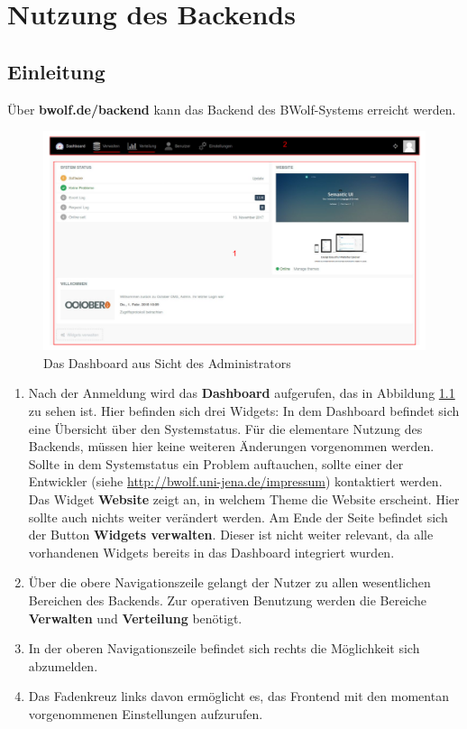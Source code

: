 \chapter{Nutzung des Backends}
\label{chapter:use}
  
  \section{Einleitung}
  \label{section:backend_introduction}
  
  Über \textbf{bwolf.de/backend} kann das Backend des BWolf-Systems erreicht werden.
  
  \begin{figure}
  	\centering
  	\includegraphics[scale=0.5]{backend/img/dashboard.pdf}
  	\caption{Das Dashboard aus Sicht des Administrators}
  	\label{fig:dashboard}
  \end{figure}
  \begin{enumerate}
   \item Nach der Anmeldung wird das \textbf{Dashboard} aufgerufen, das in Abbildung \ref{fig:dashboard} zu sehen ist. 
	  Hier befinden sich drei Widgets:\newline
	  In dem Dashboard befindet sich eine Übersicht über den Systemstatus.\newline
	  Für die elementare Nutzung des Backends, müssen hier keine weiteren Änderungen vorgenommen werden.\newline
	  Sollte in dem Systemstatus ein Problem auftauchen, sollte einer der Entwickler (siehe \url{http://bwolf.uni-jena.de/impressum}) 
	  kontaktiert werden.\newline
	  Das Widget \textbf{Website} zeigt an, in welchem Theme die Website erscheint. Hier sollte auch nichts weiter verändert werden.
	  Am Ende der Seite befindet sich der Button \textbf{Widgets verwalten}. 
	  Dieser ist nicht weiter relevant, da alle vorhandenen Widgets bereits in das Dashboard integriert wurden.
   \item Über die obere Navigationszeile gelangt der Nutzer zu allen wesentlichen Bereichen des Backends.
	 Zur operativen Benutzung werden die Bereiche \textbf{Verwalten} und \textbf{Verteilung} benötigt.
   \item[] In der oberen Navigationszeile befindet sich rechts die Möglichkeit sich abzumelden.
   \item[] Das Fadenkreuz links davon ermöglicht es, das Frontend mit den momentan vorgenommenen Einstellungen aufzurufen.
  \end{enumerate}

